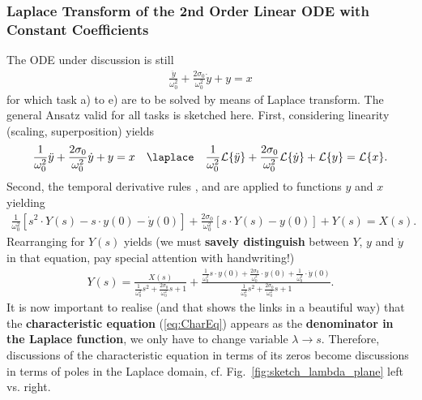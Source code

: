\subsubsection{Laplace Transform of the 2nd Order Linear ODE with Constant Coefficients}
The ODE under discussion is still 
\begin{align}
\frac{\ddot{y}}{\omega_0^2} + \frac{2 \sigma_0}{\omega_0^2} \dot{y} + y = x
\end{align}
for which task a) to e) are to be solved by means of Laplace transform.
The general Ansatz valid for all tasks is sketched here.
%
First, considering linearity (scaling, superposition) yields
\begin{align}
\frac{1}{\omega_0^2} \ddot{y} +
\frac{2 \sigma_0}{\omega_0^2} \dot{y} + y = x
\quad \laplace \quad
\frac{1}{\omega_0^2} \mathcal{L}\{\ddot{y}\} +
\frac{2 \sigma_0}{\omega_0^2} \mathcal{L}\{\dot{y}\} + \mathcal{L}\{y\} =
\mathcal{L}\{x\}.
\end{align}
%
Second, the temporal derivative rules , 
and  are applied to functions $y$ and $x$ yielding
\begin{align}
\frac{1}{\omega_0^2} \left[ s^2 \cdot Y(s) - s \cdot y(0) - \dot{y}(0)\right]  +
\frac{2 \sigma_0}{\omega_0^2} \left[ s \cdot Y(s) - y(0) \right] + Y(s) = X(s).
\end{align}
%
Rearranging for $Y(s)$ yields (we must \textbf{savely distinguish} between $Y$, $y$ and $\dot{y}$
in that equation, pay special attention with handwriting!)
\begin{align}
Y(s) = \frac{X(s)}{\frac{1}{\omega_0^2} s^2 +
\frac{2 \sigma_0}{\omega_0^2} s + 1}
+ \frac{\frac{1}{\omega_0^2} s \cdot y(0) + \frac{2 \sigma_0}{\omega_0^2} \cdot y(0) +
\frac{1}{\omega_0^2} \cdot \dot{y}(0)}{\frac{1}
{\omega_0^2} s^2 + \frac{2 \sigma_0}{\omega_0^2} s + 1}.
\end{align}
%
It is now important to realise (and that shows the links in a beautiful way)
that the \textbf{characteristic equation} (\ref{eq:CharEq})
appears as the \textbf{denominator in the Laplace function}, we only have to change
variable $\lambda\rightarrow s$.
Therefore, discussions of the characteristic equation in terms of its zeros become
discussions in terms of poles in the Laplace domain,
cf. Fig.~\ref{fig:sketch_lambda_plane} left vs. right.

